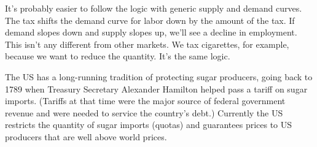 \documentclass[12pt]{exam}
\begin{document}
\begin{questions}
\begin{solution}
\begin{parts}
It's probably easier to follow the logic with generic supply and demand curves.
The tax shifts the demand curve for labor down by the amount of the tax.
If demand slopes down and supply slopes up,
we'll see a decline in employment.
This isn't any different from other markets.
We tax cigarettes, for example, because we want to reduce the quantity.
It's the same logic.

\end{parts}
\end{solution}

The US has a long-running tradition of protecting sugar producers,
going back to 1789 when Treasury Secretary Alexander Hamilton helped
pass a tariff on sugar imports.
(Tariffs at that time were the major source of federal government revenue
and were needed to service the country's debt.)
Currently the US restricts the quantity of sugar imports (quotas) and guarantees
prices to US producers that are well above world prices.


\begin{solution}
\end{solution}
\end{questions}
\end{document}
